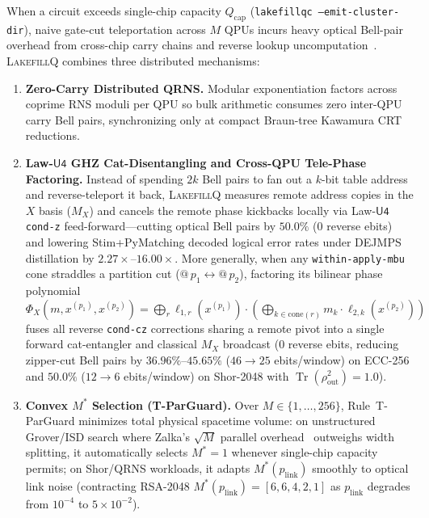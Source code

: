 \documentclass[acmsmall,screen,anonymous]{acmart}
\DeclareRobustCommand{\_}{\ifmmode\text{\char95}\else\char95\penalty0\relax\fi}
\theoremstyle{plain}
\newcommand{\LakefillQ}{\textsc{LakefillQ}}
\begin{document}
When a circuit exceeds single-chip capacity $Q_{\mathrm{cap}}$ (\texttt{lakefillqc --emit-cluster-dir}), naive gate-cut teleportation across $M$ QPUs incurs heavy optical Bell-pair overhead from cross-chip carry chains and reverse lookup uncomputation~\cite{zhou2026dshor,haner2026ionq}. \LakefillQ{} combines three distributed mechanisms:
\begin{enumerate}
  \item \textbf{Zero-Carry Distributed QRNS.} Modular exponentiation factors across coprime RNS moduli per QPU so bulk arithmetic consumes zero inter-QPU carry Bell pairs, synchronizing only at compact Braun-tree Kawamura CRT reductions.
  \item \textbf{Law-$\mathsf{U4}$ GHZ Cat-Disentangling and Cross-QPU Tele-Phase Factoring.} Instead of spending $2 k$ Bell pairs to fan out a $k$-bit table address and reverse-teleport it back, \LakefillQ{} measures remote address copies in the $X$ basis ($M_X$) and cancels the remote phase kickbacks locally via Law-$\mathsf{U4}$ \texttt{cond-z} feed-forward---cutting optical Bell pairs by $50.0\%$ ($0$ reverse ebits) and lowering Stim+PyMatching decoded logical error rates under DEJMPS distillation by $2.27\times$--$16.00\times$. More generally, when any \texttt{within-apply-mbu} cone straddles a partition cut ($@\,p_1 \leftrightarrow @\,p_2$), factoring its bilinear phase polynomial $\Phi_X(m, x^{(p_1)}, x^{(p_2)}) = \bigoplus_r \ell_{1,r}(x^{(p_1)}) \cdot (\bigoplus_{k \in \mathrm{cone}(r)} m_k \cdot \ell_{2,k}(x^{(p_2)}))$ fuses all reverse \texttt{cond-cz} corrections sharing a remote pivot into a single forward cat-entangler and classical $M_X$ broadcast ($0$ reverse ebits, reducing zipper-cut Bell pairs by $36.96\%$--$45.65\%$ ($46 \to 25$ ebits/window) on ECC-256 and $50.0\%$ ($12 \to 6$ ebits/window) on Shor-2048 with $\operatorname{Tr}(\rho_{\mathrm{out}}^2) = 1.0$).
  \item \textbf{Convex $M^*$ Selection (\textsf{T-ParGuard}).} Over $M \in \{1, \dots, 256\}$, Rule~\textsf{T-ParGuard} minimizes total physical spacetime volume: on unstructured Grover/ISD search where Zalka's $\sqrt{M}$ parallel overhead~\cite{zalka1999} outweighs width splitting, it automatically selects $M^* = 1$ whenever single-chip capacity permits; on Shor/QRNS workloads, it adapts $M^*(p_{\mathrm{link}})$ smoothly to optical link noise (contracting RSA-2048 $M^*(p_{\mathrm{link}}) = [6, 6, 4, 2, 1]$ as $p_{\mathrm{link}}$ degrades from $10^{-4}$ to $5\times 10^{-2}$).
\end{enumerate}
\end{document}
